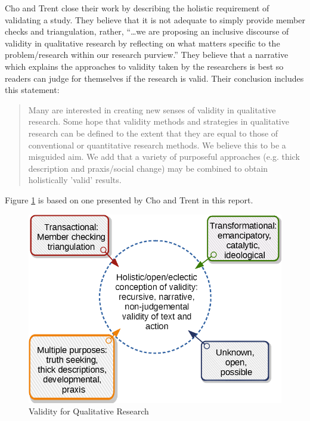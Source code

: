 Cho and Trent close their work by describing the holistic requirement of validating a study. They believe that it is not adequate to simply provide member checks and triangulation, rather, ``\ldots we are proposing an inclusive discourse of validity in qualitative research by reflecting on what matters specific to the problem/research within our research purview.'' They believe that a narrative which explains the approaches to validity taken by the researchers is best so readers can judge for themselves if the research is valid. Their conclusion includes this statement:

\begin{quote}
	Many are interested in creating new senses of validity in qualitative research. Some hope that validity methods and strategies in qualitative research can be defined to the extent that they are equal to those of conventional or quantitative research methods. We believe this to be a misguided aim. We add that a variety of purposeful approaches (e.g. thick description and praxis/social change) may be combined to obtain holistically 'valid' results.
\end{quote}

Figure \ref{05:fig05} is based on one presented by Cho and Trent in this report.

\begin{figure}[H]
	\centering
	\includegraphics[width=\maxwidth{.95\linewidth}]{gfx/05-cho}
	\caption{Validity for Qualitative Research}
	\label{05:fig05}
\end{figure}

